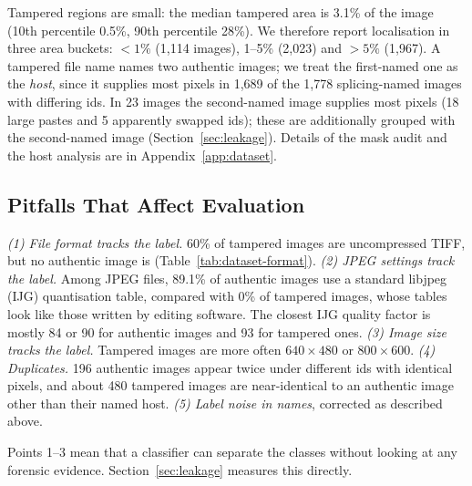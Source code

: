 Tampered regions are small: the median tampered area is 3.1\% of the image (10th percentile 0.5\%, 90th
percentile 28\%). We therefore report localisation in three area buckets: $<1\%$ (1,114 images), 1--5\%
(2,023) and $>5\%$ (1,967). A tampered file name names two authentic images; we treat the first-named one as the
\emph{host}, since it supplies most pixels in 1,689 of the 1,778 splicing-named images with differing ids. In 23
images the second-named image supplies most pixels (18 large pastes and 5 apparently swapped ids); these are
additionally grouped with the second-named image (Section~\ref{sec:leakage}). Details of the mask audit and the
host analysis are in Appendix~\ref{app:dataset}.

\subsection{Pitfalls That Affect Evaluation}\label{sec:dataset-pitfalls}

\emph{(1) File format tracks the label.} 60\% of tampered images are uncompressed TIFF, but no authentic image is
(Table~\ref{tab:dataset-format}). \emph{(2) JPEG settings track the label.} Among JPEG files, 89.1\% of authentic
images use a standard libjpeg (IJG) quantisation table, compared with 0\% of tampered images, whose tables look like
those written by editing software. The closest IJG quality factor is mostly 84 or 90 for authentic images and 93
for tampered ones. \emph{(3) Image size tracks the label.} Tampered images are more often $640\times480$ or
$800\times600$. \emph{(4) Duplicates.} 196 authentic images appear twice under different ids with identical
pixels, and about 480 tampered images are near-identical to an authentic image other than their named host.
\emph{(5) Label noise in names}, corrected as described above.

Points 1--3 mean that a classifier can separate the classes without looking at any forensic evidence.
Section~\ref{sec:leakage} measures this directly.
